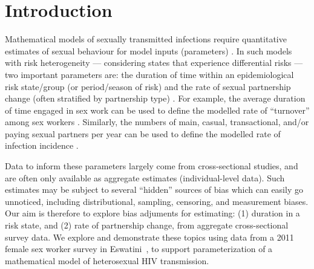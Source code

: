\section{Introduction}
Mathematical models of sexually transmitted infections require
quantitative estimates of sexual behaviour for model inputs (parameters) \cite{Garnett2002}.
In such models with risk heterogeneity
--- \ie considering states that experience differential risks ---
two important parameters are:
the duration of time within an epidemiological risk state/group (or period/season of risk) and
the rate of sexual partnership change (often stratified by partnership type)
\cite{Garnett1996,Stigum1997,Watts2010,Knight2020}.
For example, the average duration of time engaged in sex work
can be used to define the modelled rate of ``turnover'' among sex workers \cite{Watts2010}.
Similarly, the numbers of main, casual, transactional, and/or paying sexual partners per year
can be used to define the modelled rate of infection incidence \cite{Boily2015}.
\par
Data to inform these parameters largely come from cross-sectional studies,
and are often only available as aggregate estimates (\vs individual-level data).
Such estimates may be subject to several ``hidden'' sources of bias which can easily go unnoticed,
including distributional, sampling, censoring, and measurement biases.
Our aim is therefore to explore bias adjuments for estimating:
(1) duration in a risk state, and (2) rate of partnership change,
from aggregate cross-sectional survey data.
We explore and demonstrate these topics using data from
a 2011 female sex worker survey in Eswatini~\cite{Baral2014},
to support parameterization of a mathematical model of heterosexual HIV transmission.
